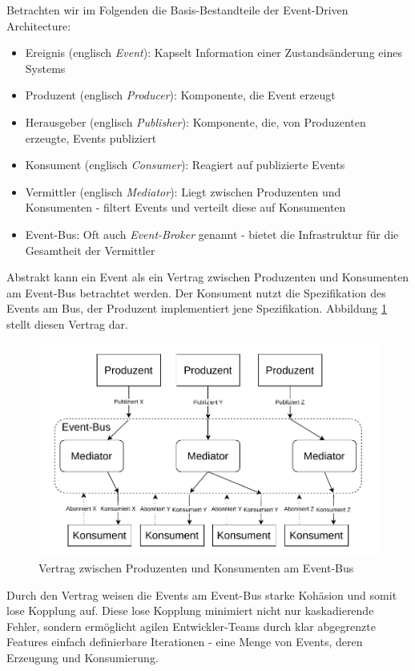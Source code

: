 \documentclass[acmtog]{acmart}
\begin{document}
    Betrachten wir im Folgenden die Basis-Bestandteile der Event-Driven Architecture:
    \begin{itemize}
        \item Ereignis (englisch \textit{Event}): Kapselt Information einer Zustandsänderung eines Systems
        \item Produzent (englisch \textit{Producer}): Komponente, die Event erzeugt
        \item Herausgeber (englisch \textit{Publisher}): Komponente, die, von Produzenten erzeugte, Events publiziert
        \item Konsument (englisch \textit{Consumer}): Reagiert auf publizierte Events
        \item Vermittler (englisch \textit{Mediator}): Liegt zwischen Produzenten und Konsumenten - filtert Events und verteilt diese auf Konsumenten
        \item Event-Bus: Oft auch \textit{Event-Broker} genannt - bietet die Infrastruktur für die Gesamtheit der Vermittler
    \end{itemize}
    Abstrakt kann ein Event als ein Vertrag zwischen Produzenten und Konsumenten am Event-Bus betrachtet werden.
    Der Konsument nutzt die Spezifikation des Events am Bus, der Produzent implementiert jene Spezifikation.
    Abbildung \ref{fig:eda} stellt diesen Vertrag dar.

    \begin{figure}[!h]
        \centering
        \includegraphics[width=\linewidth]{images/eda/eda.drawio}
        \caption{Vertrag zwischen Produzenten und Konsumenten am Event-Bus}
        \label{fig:eda}
    \end{figure}

    Durch den Vertrag weisen die Events am Event-Bus starke Kohäsion und somit lose Kopplung auf.
    Diese lose Kopplung minimiert nicht nur kaskadierende Fehler, sondern ermöglicht agilen Entwickler-Teams durch klar abgegrenzte Features einfach definierbare Iterationen
    - eine Menge von Events, deren Erzeugung und Konsumierung.
\end{document}
